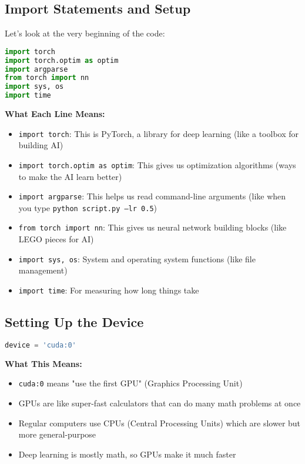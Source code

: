 \documentclass[12pt]{article}
\begin{document}
\subsection{Import Statements and Setup}

Let's look at the very beginning of the code:

\begin{lstlisting}[language=Python, basicstyle=\small]
import torch
import torch.optim as optim
import argparse
from torch import nn
import sys, os
import time
\end{lstlisting}

\textbf{What Each Line Means:}
\begin{itemize}
    \item \texttt{import torch}: This is PyTorch, a library for deep learning (like a toolbox for building AI)
    \item \texttt{import torch.optim as optim}: This gives us optimization algorithms (ways to make the AI learn better)
    \item \texttt{import argparse}: This helps us read command-line arguments (like when you type \texttt{python script.py --lr 0.5})
    \item \texttt{from torch import nn}: This gives us neural network building blocks (like LEGO pieces for AI)
    \item \texttt{import sys, os}: System and operating system functions (like file management)
    \item \texttt{import time}: For measuring how long things take
\end{itemize}

\subsection{Setting Up the Device}

\begin{lstlisting}[language=Python, basicstyle=\small]
device = 'cuda:0'
\end{lstlisting}

\textbf{What This Means:}
\begin{itemize}
    \item \texttt{cuda:0} means "use the first GPU" (Graphics Processing Unit)
    \item GPUs are like super-fast calculators that can do many math problems at once
    \item Regular computers use CPUs (Central Processing Units) which are slower but more general-purpose
    \item Deep learning is mostly math, so GPUs make it much faster
\end{itemize}
\end{document}

